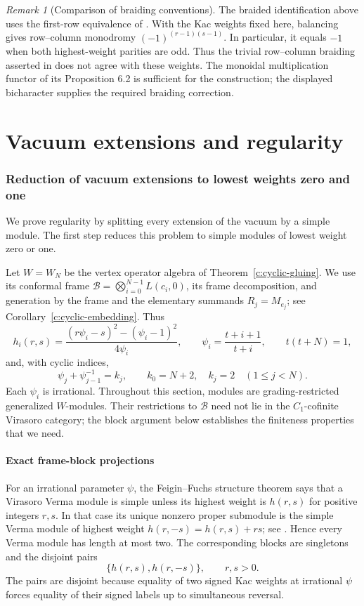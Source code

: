 \documentclass[11pt,a4paper]{article}
\numberwithin{equation}{section}
\theoremstyle{definition}\newtheorem{definition}[theorem]{Definition}
\theoremstyle{remark}\newtheorem{remark}[theorem]{Remark}
\begin{document}
\begin{remark}[Comparison of braiding conventions]
The braided identification above uses the first-row equivalence of
\cite{c:Koshida}. With the Kac weights fixed here, balancing gives
row--column monodromy $(-1)^{(r-1)(s-1)}$. In particular, it equals
$-1$ when both highest-weight parities are odd. Thus the trivial
row--column braiding asserted in \cite[Proposition 6.3]{c:Koshida}
does not agree with these weights. The monoidal multiplication
functor of its Proposition 6.2 is sufficient for the construction;
the displayed bicharacter supplies the required braiding correction.
\end{remark}

\part{Vacuum extensions and regularity}

\section{Reduction of vacuum extensions to lowest weights zero and one}
\label{neutral:sec:neutral-reduction}

We prove regularity by splitting every extension of the vacuum
by a simple module.  The first step reduces this problem to simple
modules of lowest weight zero or one.

Let $W=W_N$ be the vertex operator algebra of
Theorem~\ref{c:cyclic-gluing}.  We use its conformal frame
$\mathcal B=\bigotimes_{i=0}^{N-1}L(c_i,0)$, its frame decomposition,
and generation by the frame and the elementary summands $R_j=M_{e_j}$;
see Corollary~\ref{c:cyclic-embedding}.
Thus
\[
 h_i(r,s)=\frac{(r\psi_i-s)^2-(\psi_i-1)^2}{4\psi_i},\qquad
 \psi_i=\frac{t+i+1}{t+i},\qquad t(t+N)=1,
\]
and, with cyclic indices,
\[
 \psi_j+\psi_{j-1}^{-1}=k_j,
 \qquad k_0=N+2,\quad k_j=2\quad(1\leq j<N).
\]
Each $\psi_i$ is irrational.  Throughout this section, modules are
grading-restricted generalized $W$-modules.  Their restrictions to
$\mathcal B$ need not lie in the $C_1$-cofinite Virasoro category;
the block argument below establishes the finiteness properties that
we need.

\subsection{Exact frame-block projections}

For an irrational parameter $\psi$, the Feigin--Fuchs structure theorem
says that a Virasoro Verma module is simple unless its highest weight
is $h(r,s)$ for positive integers $r,s$.  In that case its unique
nonzero proper submodule is the simple Verma module of highest weight
$h(r,-s)=h(r,s)+rs$; see \cite[Proposition 2.2.1 and
Theorem 2.2.4]{virasoro}.  Hence every Verma module has length at most two.
The corresponding blocks are singletons and the disjoint pairs
\[
                     \{h(r,s),h(r,-s)\},\qquad r,s>0.
\]
The pairs are disjoint because equality of two signed Kac weights at
irrational $\psi$ forces equality of their signed labels up to
simultaneous reversal.
\end{document}

